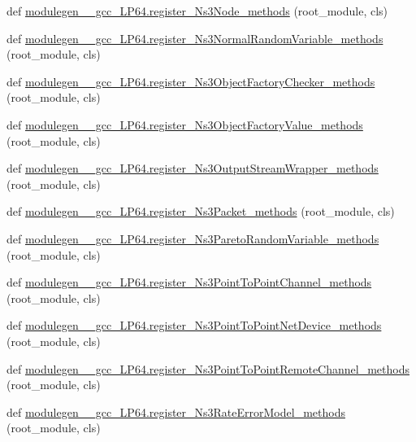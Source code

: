 \begin{DoxyCompactItemize}
\item 
def \hyperlink{namespacemodulegen____gcc__LP64_a158d48a8db192c306a8eff9ae0b0503a}{modulegen\+\_\+\+\_\+gcc\+\_\+\+L\+P64.\+register\+\_\+\+Ns3\+Node\+\_\+methods} (root\+\_\+module, cls)
\item 
def \hyperlink{namespacemodulegen____gcc__LP64_aa148bd7210335689691b38939225327f}{modulegen\+\_\+\+\_\+gcc\+\_\+\+L\+P64.\+register\+\_\+\+Ns3\+Normal\+Random\+Variable\+\_\+methods} (root\+\_\+module, cls)
\item 
def \hyperlink{namespacemodulegen____gcc__LP64_a4f37eb35629332dd2318799b3efe197e}{modulegen\+\_\+\+\_\+gcc\+\_\+\+L\+P64.\+register\+\_\+\+Ns3\+Object\+Factory\+Checker\+\_\+methods} (root\+\_\+module, cls)
\item 
def \hyperlink{namespacemodulegen____gcc__LP64_aa08b54c074e688b2a88a54ada11db8fc}{modulegen\+\_\+\+\_\+gcc\+\_\+\+L\+P64.\+register\+\_\+\+Ns3\+Object\+Factory\+Value\+\_\+methods} (root\+\_\+module, cls)
\item 
def \hyperlink{namespacemodulegen____gcc__LP64_acc3c2935e4b09f91d6a35d059f746a4a}{modulegen\+\_\+\+\_\+gcc\+\_\+\+L\+P64.\+register\+\_\+\+Ns3\+Output\+Stream\+Wrapper\+\_\+methods} (root\+\_\+module, cls)
\item 
def \hyperlink{namespacemodulegen____gcc__LP64_a6784a1ccebf471415830ba331480b02c}{modulegen\+\_\+\+\_\+gcc\+\_\+\+L\+P64.\+register\+\_\+\+Ns3\+Packet\+\_\+methods} (root\+\_\+module, cls)
\item 
def \hyperlink{namespacemodulegen____gcc__LP64_aa21dc78e803a5556dfdef52ccbbd7b3c}{modulegen\+\_\+\+\_\+gcc\+\_\+\+L\+P64.\+register\+\_\+\+Ns3\+Pareto\+Random\+Variable\+\_\+methods} (root\+\_\+module, cls)
\item 
def \hyperlink{namespacemodulegen____gcc__LP64_ae1c364482914ae921514aa158cd0d76c}{modulegen\+\_\+\+\_\+gcc\+\_\+\+L\+P64.\+register\+\_\+\+Ns3\+Point\+To\+Point\+Channel\+\_\+methods} (root\+\_\+module, cls)
\item 
def \hyperlink{namespacemodulegen____gcc__LP64_a94dc8aa5b99180cd556b04a91001bf0a}{modulegen\+\_\+\+\_\+gcc\+\_\+\+L\+P64.\+register\+\_\+\+Ns3\+Point\+To\+Point\+Net\+Device\+\_\+methods} (root\+\_\+module, cls)
\item 
def \hyperlink{namespacemodulegen____gcc__LP64_ae3f4d1c3056d96c17487a25a8244c711}{modulegen\+\_\+\+\_\+gcc\+\_\+\+L\+P64.\+register\+\_\+\+Ns3\+Point\+To\+Point\+Remote\+Channel\+\_\+methods} (root\+\_\+module, cls)
\item 
def \hyperlink{namespacemodulegen____gcc__LP64_a6a4f882d328be44e7206312c2578576b}{modulegen\+\_\+\+\_\+gcc\+\_\+\+L\+P64.\+register\+\_\+\+Ns3\+Rate\+Error\+Model\+\_\+methods} (root\+\_\+module, cls)

\end{DoxyCompactItemize}
